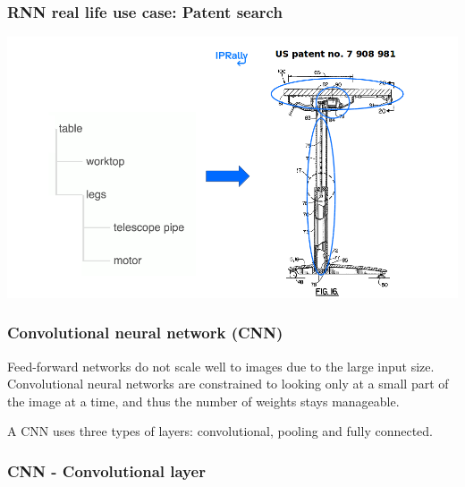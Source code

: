 \documentclass{beamer}
\begin{document}
  \begin{frame}
    \frametitle{RNN real life use case: Patent search}  
  \includegraphics[scale=0.32]{patent_search_iprally_slide_20190106} 
  \end{frame}

  \begin{frame}
    \frametitle{Convolutional neural network (CNN)}  
    
  Feed-forward networks do not scale well to images due to the large input size. Convolutional neural networks are constrained to looking only at a small part of the image at a time, and thus the number of weights stays manageable.
   \vspace{8mm}
  
  A CNN uses three types of layers: convolutional, pooling and fully connected. 
  

  \end{frame}  
  
  \begin{frame}
    \frametitle{CNN - Convolutional layer}  
	   	\begin{itemize}
	\end{itemize}
  \end{frame}   
  
\end{document}
